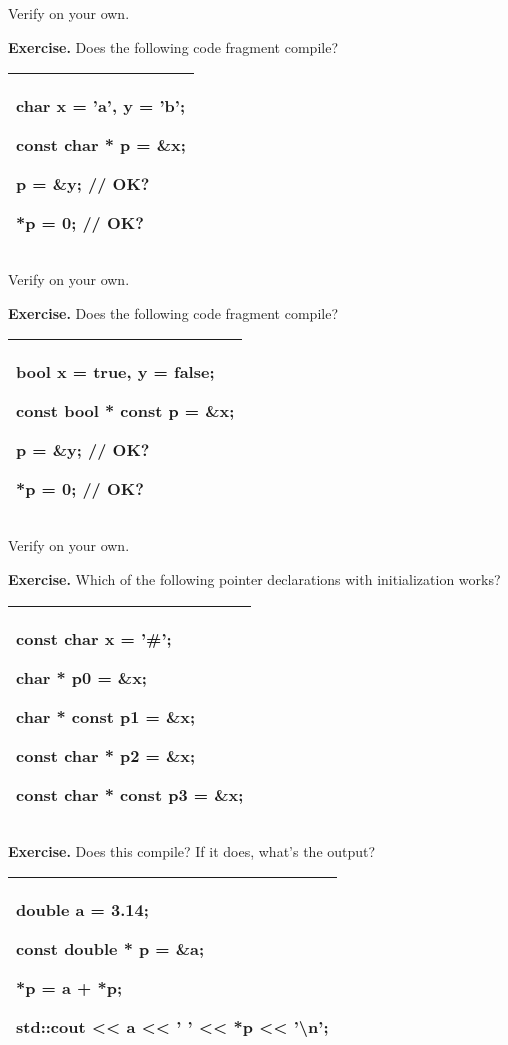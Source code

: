 \documentclass[
]{article}
\begin{document}
Verify on your own.

\textbf{Exercise.} Does the following code fragment compile?

\begin{longtable}[]{@{}l@{}}
\toprule
\endhead
\begin{minipage}[t]{0.97\columnwidth}\raggedright
char x = 'a', y = 'b';

const char * p = \&x;

p = \&y; // OK?

*p = 0; // OK?\strut
\end{minipage}\tabularnewline
\bottomrule
\end{longtable}

Verify on your own.

\textbf{Exercise.} Does the following code fragment compile?

\begin{longtable}[]{@{}l@{}}
\toprule
\endhead
\begin{minipage}[t]{0.97\columnwidth}\raggedright
bool x = true, y = false;

const bool * const p = \&x;

p = \&y; // OK?

*p = 0; // OK?\strut
\end{minipage}\tabularnewline
\bottomrule
\end{longtable}

Verify on your own.

\textbf{Exercise.} Which of the following pointer declarations with
initialization works?

\begin{longtable}[]{@{}l@{}}
\toprule
\endhead
\begin{minipage}[t]{0.97\columnwidth}\raggedright
const char x = '\#';

char * p0 = \&x;

char * const p1 = \&x;

const char * p2 = \&x;

const char * const p3 = \&x;\strut
\end{minipage}\tabularnewline
\bottomrule
\end{longtable}

\textbf{Exercise.} Does this compile? If it does, what's the output?

\begin{longtable}[]{@{}l@{}}
\toprule
\endhead
\begin{minipage}[t]{0.97\columnwidth}\raggedright
double a = 3.14;

const double * p = \&a;

*p = a + *p;

std::cout \textless\textless{} a \textless\textless{} ' '
\textless\textless{} *p \textless\textless{} '\textbackslash n';\strut
\end{minipage}\tabularnewline
\bottomrule
\end{longtable}
\end{document}
